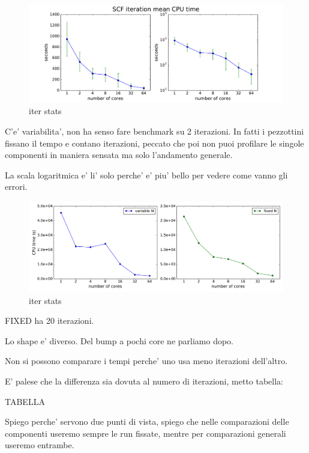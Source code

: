 \documentclass[a4paper,12pt]{article}
\begin{document}
\begin{figure}[hhh!]
	\centerline{\includegraphics[width=1.2\linewidth]{iterstats.pdf}}
	\caption{ iter stats
	}
	\label{fig:iterstats}
\end{figure}
C'e' variabilita', non ha senso fare benchmark su 2 iterazioni. In fatti i pezzottini fissano il tempo e contano iterazioni, peccato che poi non puoi profilare le singole componenti in maniera sensata ma solo l'andamento generale.

La scala logaritmica e' li' solo perche' e' piu' bello per vedere come vanno gli errori.


\newpage

\begin{figure}[hhh!]
	\centerline{\includegraphics[width=1.2\linewidth]{fixed_vs_variable.pdf}}
	\caption{ iter stats
	}
	\label{fig:fixedvsvariable}
\end{figure}

FIXED ha 20 iterazioni.

Lo shape e' diverso. Del bump a pochi core ne parliamo dopo.

Non si possono comparare i tempi perche' uno usa meno iterazioni dell'altro.

E' palese che la differenza sia dovuta al numero di iterazioni, metto tabella:

TABELLA


Spiego perche' servono due punti di vista, spiego che nelle comparazioni delle componenti useremo sempre le run fissate, mentre per comparazioni generali useremo entrambe.
\end{document}
